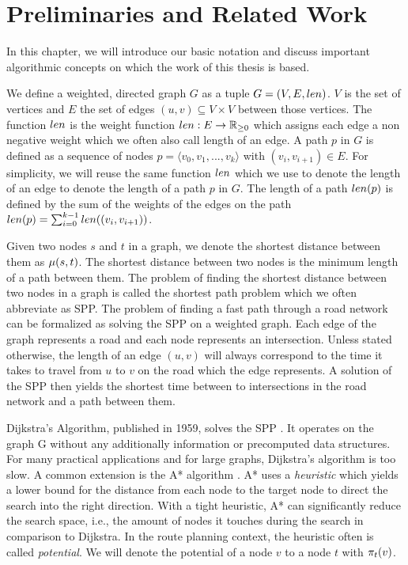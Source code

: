 
\chapter{Preliminaries and Related Work}
\label{ch:preliminaries}
In this chapter, we will introduce our basic notation and discuss important algorithmic concepts on which the work of this thesis is based.

We define a weighted, directed graph $G$ as a tuple $G=(V,E,len)$. $V$ is the set of vertices and $E$ the set of edges $(u,v) \subseteq V \times V$ between those vertices. The function $len$ is the weight function $len: E \rightarrow \mathbb{R}_{\ge 0}$ which assigns each edge a non negative weight which we often also call length of an edge. A path $p$ in $G$ is defined as a sequence of nodes $p = \langle v_0,v_1,...,v_k \rangle$ with $(v_i,v_{i+1}) \in E$. For simplicity, we will reuse the same function $len$ which we use to denote the length of an edge to denote the length of a path $p$ in $G$. The length of a path $len(p)$ is defined by the sum of the weights of the edges on the path $len(p) = \sum_{i=0}^{k-1}{len((v_i,v_{i+1}))}$.

Given two nodes $s$ and $t$ in a graph, we denote the shortest distance between them as $\mu(s,t)$. The shortest distance between two nodes is the minimum length of a path between them. The problem of finding the shortest distance between two nodes in a graph is called the shortest path problem which we often abbreviate as SPP. The problem of finding a fast path through a road network can be formalized as solving the SPP on a weighted graph. Each edge of the graph represents a road and each node represents an intersection. Unless stated otherwise, the length  of an edge $(u,v)$ will always correspond to the time it takes to travel from $u$ to $v$ on the road which the edge represents. A solution of the SPP then yields the shortest time between to intersections in the road network and a path between them.

Dijkstra's Algorithm, published in 1959, solves the SPP \cite{dijkstra:1959}. It operates on the graph G without any additionally information or precomputed data structures. For many practical applications and for large graphs, Dijkstra's algorithm is too slow. A common extension is the A* algorithm \cite{hart:1968}. A* uses a \emph{heuristic} which yields a lower bound for the distance from each node to the target node to direct the search into the right direction. With a tight heuristic, A* can significantly reduce the search space, i.e., the amount of nodes it touches during the search in comparison to Dijkstra. In the route planning context, the heuristic often is called \emph{potential}. We will denote the potential of a node $v$ to a node $t$ with $\pi_t(v)$.

